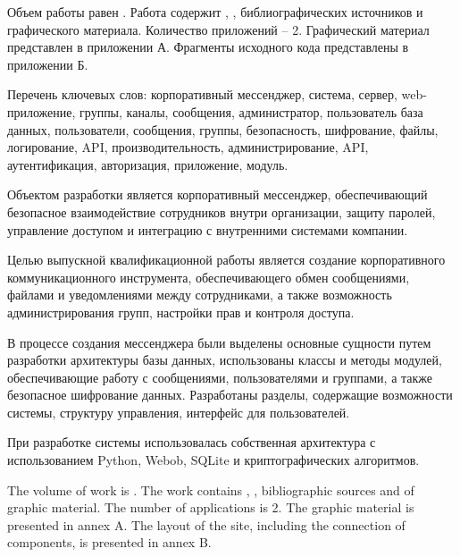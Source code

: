 
\setlength{\parindent}{1.25cm}

Объем работы равен . Работа содержит , ,  библиографических источников и  графического материала. Количество приложений – 2. Графический материал представлен в приложении А. Фрагменты исходного кода представлены в приложении Б.

Перечень ключевых слов: корпоративный мессенджер, система, сервер, web-приложение, группы, каналы, сообщения, администратор, пользователь база данных, пользователи, сообщения, группы, безопасность, шифрование, файлы, логирование, API, производительность, администрирование, API, аутентификация, авторизация, приложение, модуль.

Объектом разработки является корпоративный мессенджер, обеспечивающий безопасное взаимодействие сотрудников внутри организации, защиту паролей, управление доступом и интеграцию с внутренними системами компании.

Целью выпускной квалификационной работы является создание корпоративного коммуникационного инструмента, обеспечивающего обмен сообщениями, файлами и уведомлениями между сотрудниками, а также возможность администрирования групп, настройки прав и контроля доступа.

В процессе создания мессенджера были выделены основные сущности путем разработки архитектуры базы данных, использованы классы и методы модулей, обеспечивающие работу с сообщениями, пользователями и группами, а также безопасное шифрование данных. Разработаны разделы, содержащие возможности системы, структуру управления, интерфейс для пользователей.

При разработке системы использовалась собственная архитектура с использованием Python, Webob, SQLite и криптографических алгоритмов.

  
The volume of work is . The work contains , ,  bibliographic sources and  of graphic material. The number of applications is 2. The graphic material is presented in annex A. The layout of the site, including the connection of components, is presented in annex B.

